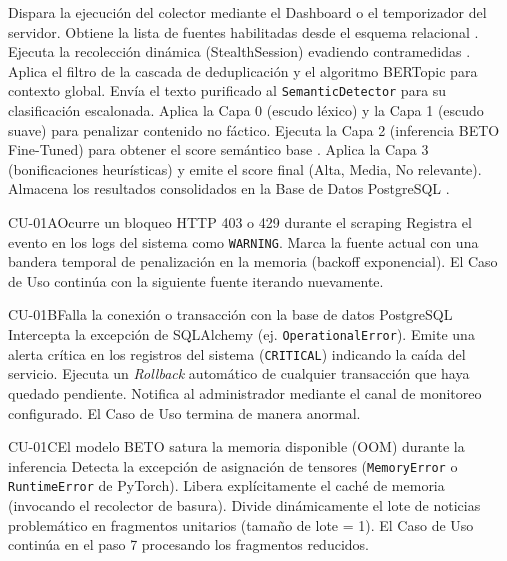 \begin{UCtrayectoria}
	\UCpaso[\UCActor] Dispara la ejecución del colector mediante el Dashboard o el temporizador del servidor.
	\UCpaso[\UCsist] Obtiene la lista de fuentes habilitadas desde el esquema relacional .
	\UCpaso[\UCsist] Ejecuta la recolección dinámica (StealthSession) evadiendo contramedidas .
	\UCpaso[\UCsist] Aplica el filtro de la cascada de deduplicación y el algoritmo BERTopic para contexto global.
	\UCpaso[\UCsist] Envía el texto purificado al \texttt{SemanticDetector} para su clasificación escalonada.
	\UCpaso[\UCsist] Aplica la Capa 0 (escudo léxico) y la Capa 1 (escudo suave) para penalizar contenido no fáctico.
	\UCpaso[\UCsist] Ejecuta la Capa 2 (inferencia BETO Fine-Tuned) para obtener el score semántico base .
	\UCpaso[\UCsist] Aplica la Capa 3 (bonificaciones heurísticas) y emite el score final (Alta, Media, No relevante).
	\UCpaso[\UCsist] Almacena los resultados consolidados en la Base de Datos PostgreSQL .
\end{UCtrayectoria}

\begin{UCtrayectoriaA}{CU-01}{A}{Ocurre un bloqueo HTTP 403 o 429 durante el scraping}
	\UCpaso Registra el evento en los logs del sistema como \texttt{WARNING}.
	\UCpaso Marca la fuente actual con una bandera temporal de penalización en la memoria (backoff exponencial).
	\UCpaso[] El Caso de Uso continúa con la siguiente fuente iterando nuevamente.
\end{UCtrayectoriaA}

\begin{UCtrayectoriaA}{CU-01}{B}{Falla la conexión o transacción con la base de datos PostgreSQL}
	\UCpaso Intercepta la excepción de SQLAlchemy (ej. \texttt{OperationalError}).
	\UCpaso Emite una alerta crítica en los registros del sistema (\texttt{CRITICAL}) indicando la caída del servicio.
	\UCpaso Ejecuta un \textit{Rollback} automático de cualquier transacción que haya quedado pendiente.
	\UCpaso Notifica al administrador mediante el canal de monitoreo configurado.
	\UCpaso[] El Caso de Uso termina de manera anormal.
\end{UCtrayectoriaA}

\begin{UCtrayectoriaA}{CU-01}{C}{El modelo BETO satura la memoria disponible (OOM) durante la inferencia}
	\UCpaso Detecta la excepción de asignación de tensores (\texttt{MemoryError} o \texttt{RuntimeError} de PyTorch).
	\UCpaso Libera explícitamente el caché de memoria (invocando el recolector de basura).
	\UCpaso Divide dinámicamente el lote de noticias problemático en fragmentos unitarios (tamaño de lote = 1).
	\UCpaso[] El Caso de Uso continúa en el paso 7 procesando los fragmentos reducidos.
\end{UCtrayectoriaA}
